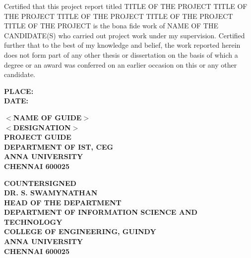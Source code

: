 \documentclass[13 pt,a4paper]{aureportm}
\begin{document}
\begin{spacing}{1.5}
  \begin{sloppypar}
  \fontsize{13}{14.5}\selectfont Certified that this project report titled TITLE OF THE PROJECT TITLE OF THE PROJECT TITLE OF THE PROJECT TITLE OF THE PROJECT TITLE OF THE PROJECT is the bona fide work of NAME OF THE CANDIDATE(S) who carried out project work under my supervision. Certified further that to the best of my knowledge and belief, the work reported herein does not form part of any other thesis or dissertation on the basis of which a degree or an award was conferred on an earlier occasion on this or any other candidate.
  \end{sloppypar}
\end{spacing}
\vspace{-0.3 cm}
\begin{flushleft}
 \parbox[t]{\datewidth}{\small{\textbf{PLACE: }}\\
 \small{\textbf{DATE: }}}
 \hfill
 \parbox[t]{6 cm}{\small{\textbf{$<$NAME OF GUIDE$>$}} \\
 \small{\textbf{$<$DESIGNATION$>$}}\\
 \small{\textbf{PROJECT GUIDE}}\\
 \small{\textbf{DEPARTMENT OF IST, CEG}}\\
 \small{\textbf{ANNA UNIVERSITY}}   \\
 \small{\textbf{CHENNAI  600025}}
 }
\end{flushleft}
\begin{center}
 \small{\textbf{COUNTERSIGNED}}\\
  \vspace{1.5 cm}
  \textbf{\small{DR. S. SWAMYNATHAN}}\\
  \small{\textbf{HEAD OF THE DEPARTMENT}}\\
 \small{\textbf{DEPARTMENT OF INFORMATION SCIENCE AND TECHNOLOGY}}\\
 \small{\textbf{COLLEGE OF ENGINEERING, GUINDY}}\\
 \small{\textbf{ANNA UNIVERSITY}}   \\
 \small{\textbf{CHENNAI  600025}}

\end{center}




\end{document}
